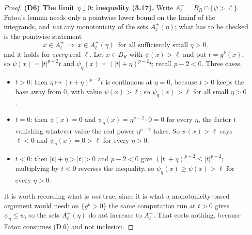\begin{proof}
\textbf{(D6) The limit $\eta\downarrow0$: inequality (3.17).}  Write
$A^+_\ell=B_R\cap\{\psi>\ell\}$.  Fatou's lemma needs only a pointwise lower
bound on the liminf of the integrands, and \emph{not} any monotonicity of the
sets $A^+_\ell(\eta)$; what has to be checked is the pointwise statement
\[
x\in A^+_\ell\ \Longrightarrow\ x\in A^+_\ell(\eta)\ \text{ for all sufficiently
small }\eta>0 ,
\tag{D.6}
\]
and it holds for \emph{every} real $\ell$.  Let $x\in B_R$ with $\psi(x)>\ell$
and put $t=g^k(x)$, so $\psi(x)=|t|^{p-2}t$ and $\psi_\eta(x)=(|t|+\eta)^{p-2}t$;
recall $p-2<0$.  Three cases.
\begin{itemize}
\item $t>0$: then $\eta\mapsto(t+\eta)^{p-2}t$ is continuous at $\eta=0$,
  because $t>0$ keeps the base away from $0$, with value $\psi(x)>\ell$; so
  $\psi_\eta(x)>\ell$ for all small $\eta>0$.
\item $t=0$: then $\psi(x)=0$ and $\psi_\eta(x)=\eta^{p-2}\cdot0=0$ for every
  $\eta$, the factor $t$ vanishing whatever value the real power $\eta^{p-2}$
  takes.  So $\psi(x)>\ell$ says $\ell<0$ and $\psi_\eta(x)=0>\ell$ for every
  $\eta>0$.
\item $t<0$: then $|t|+\eta>|t|>0$ and $p-2<0$ give
  $(|t|+\eta)^{p-2}\le|t|^{p-2}$; multiplying by $t<0$ reverses the inequality,
  so $\psi_\eta(x)\ge\psi(x)>\ell$ for every $\eta>0$.
\end{itemize}
It is worth recording what is \emph{not} true, since it is what a
monotonicity-based argument would need: on $\{g^k>0\}$ the same computation run
at $t>0$ gives $\psi_\eta\le\psi$, so the sets $A^+_\ell(\eta)$ do not increase
to $A^+_\ell$.  That costs nothing, because Fatou consumes (D.6) and not
inclusion.


\end{proof}
